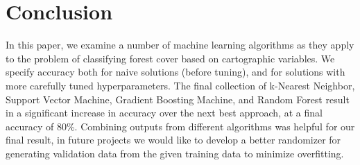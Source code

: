 \section{Conclusion}
\label{sec:-conc}

In this paper, we examine a number of machine learning algorithms as 
they apply to the problem of classifying forest cover based on 
cartographic variables.  We specify accuracy both for naive solutions 
(before tuning), and for solutions with more carefully tuned 
hyperparameters.  The final collection of k-Nearest Neighbor, Support 
Vector Machine, Gradient Boosting Machine, and Random Forest result in 
a significant increase in accuracy over the next best approach, at a 
final accuracy of 80\%. Combining outputs from different algorithms
was helpful for our final result, in future projects we would like
to develop a better randomizer for generating validation data from
the given training data to minimize overfitting.





